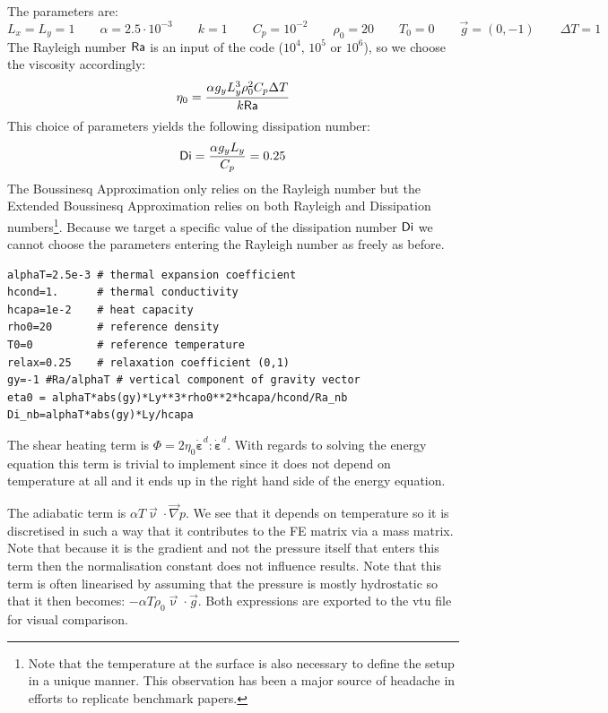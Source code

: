 The parameters are:
\[
L_x=L_y=1
\qquad
\alpha=2.5\cdot 10^{-3}
\qquad
k=1
\qquad
C_p=10^{-2}
\qquad
\rho_0=20
\qquad
T_0=0
\qquad
\vec{g}=(0,-1)
\qquad
\Delta T = 1
\]
The Rayleigh number ${\mathsf{Ra}}$ is an input of the code ($10^4$, $10^5$ or $10^6$), so 
we choose the viscosity accordingly:
\[
\eta_0 = \frac{\alpha g_y L_y^3 \rho_0^2 C_p \Delta T}{k {\mathsf{Ra}}}
\]
This choice of parameters yields the following dissipation number:
\[
{\mathsf{Di}}=\frac{\alpha g_y L_y}{C_p} = 0.25
\]
The Boussinesq Approximation only relies on the Rayleigh number but the 
Extended Boussinesq Approximation relies on both Rayleigh and Dissipation numbers\footnote{Note that 
the temperature at the surface is also necessary to define the setup in a unique manner. This observation
has been a major source of headache in efforts to replicate benchmark papers.}. 
Because we target a specific value of the dissipation number ${\mathsf{Di}}$ we cannot choose the 
parameters entering the Rayleigh number as freely as before.

\begin{lstlisting}
alphaT=2.5e-3 # thermal expansion coefficient
hcond=1.      # thermal conductivity
hcapa=1e-2    # heat capacity
rho0=20       # reference density
T0=0          # reference temperature
relax=0.25    # relaxation coefficient (0,1)
gy=-1 #Ra/alphaT # vertical component of gravity vector
eta0 = alphaT*abs(gy)*Ly**3*rho0**2*hcapa/hcond/Ra_nb
Di_nb=alphaT*abs(gy)*Ly/hcapa
\end{lstlisting}

The shear heating term is $\Phi=2 \eta_0 \dot{\bm \varepsilon}^d:\dot{\bm \varepsilon}^d$. 
With regards to solving the energy equation this term is trivial to implement 
since it does not depend on temperature at all and it ends up in the right hand side of
the energy equation.

The adiabatic term is $\alpha T \vec{\upnu}\cdot\vec\nabla p$. 
We see that it depends on temperature so it is discretised in such a 
way that it contributes to the FE matrix via a mass matrix. 
Note that because it is the gradient and not the pressure itself that enters this term then 
the normalisation constant does not influence results.
Note that this term is often linearised by assuming that the pressure is mostly hydrostatic
so that it then becomes: $- \alpha T \rho_0 \vec\upnu\cdot\vec{g}$.
Both expressions are exported to the vtu file for visual comparison.

